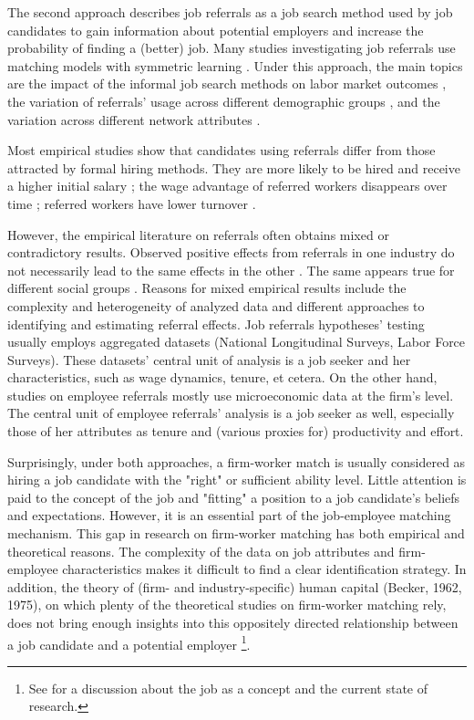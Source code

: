 \documentclass[12pt]{article}
\begin{document}
The second approach describes job referrals as a job search method used by job candidates to gain information about potential employers and increase the probability of finding a (better) job. Many studies investigating job referrals use matching models with symmetric learning \citep{jovanovic1979job}. Under this approach, the main topics are the impact of the informal job search methods on labor market outcomes \citep{simon1992matchmaker, montgomery1992job, elliott1999social}, the variation of referrals’ usage across different demographic groups \citep{lalanne2016old, calvo2004effects, holzer1986informal}, and the variation across different network attributes \citep{lester2021heterogeneous, kuzubas2009endogenous, granovetter1995coase, montgomery1994weak}. 

Most empirical studies show that candidates using referrals differ from those attracted by formal hiring methods. They are more likely to be hired \citep{burks2015value} and receive a higher initial salary \citep{galenianos2013learning}; the wage advantage of referred workers disappears over time \citep{dustmann2016referral}; referred workers have lower turnover \citep{heath2018firms}.

However, the empirical literature on referrals often obtains mixed or contradictory results. Observed positive effects from referrals in one industry do not necessarily lead to the same effects in the other \citep{burks2015value}. The same appears true for different social groups \citep{calvo2004effects}. Reasons for mixed empirical results include the complexity and heterogeneity of analyzed data and different approaches to identifying and estimating referral effects. Job referrals hypotheses' testing usually employs aggregated datasets (National Longitudinal Surveys, Labor Force Surveys). These datasets' central unit of analysis is a job seeker and her characteristics, such as wage dynamics, tenure, et cetera. On the other hand, studies on employee referrals mostly use microeconomic data at the firm's level. The central unit of employee referrals' analysis is a job seeker as well, especially those of her attributes as tenure and (various proxies for) productivity and effort.

Surprisingly, under both approaches, a firm-worker match is usually considered as hiring a job candidate with the "right" or sufficient ability level. Little attention is paid to the concept of the job and "fitting" a position to a job candidate's beliefs and expectations. However, it is an essential part of the job-employee matching mechanism. This gap in research on firm-worker matching has both empirical and theoretical reasons. The complexity of the data on job attributes and firm-employee characteristics makes it difficult to find a clear identification strategy. In addition, the theory of (firm- and industry-specific) human capital (Becker, 1962, 1975), on which plenty of the theoretical studies on firm-worker matching rely,  does not bring enough insights into this oppositely directed relationship between a job candidate and a potential employer \footnote{See \cite{lazear2011inside} for a discussion about the job as a concept and the current state of research.}. 
\end{document}
